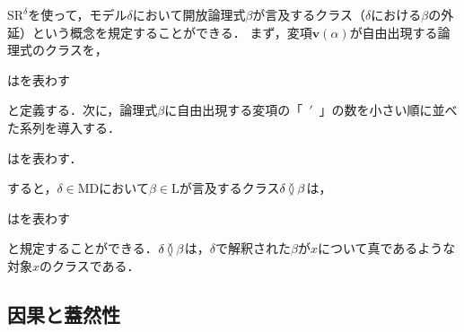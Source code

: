 $\mathrm{SR}^\delta$を使って，モデル$\delta$において開放論理式$\beta$が言及するクラス（$\delta$における$\beta$の外延）という概念を規定することができる．
まず，変項$ \boldsymbol{v}(\alpha) $が自由出現する論理式のクラスを，
\begin{df}
\label{df:開放論理式のクラス}
はを表わす
\end{df}
\noindent と定義する．次に，論理式$ \beta $に自由出現する変項の「~$'$~」の数を小さい順に並べた系列を導入する．

\begin{df}
\label{df:変項列}
はを表わす．
\end{df}

\noindent すると，$\delta\in\mathrm{MD}$において$\beta\in\mathrm{L}$が言及するクラス$\delta\exten\beta$は，

\begin{df}
\label{df:}
\kagi{$
    \delta\exten\beta
$}はを表わす
\end{df}

\noindent と規定することができる．$\delta\exten\beta$は，$\delta$で解釈された$\beta$が$x$について真であるような対象$x$のクラスである．

\subsection{因果と蓋然性}
\label{ssec:因果と蓋然性}

